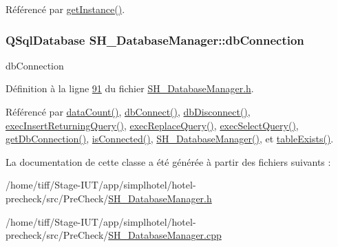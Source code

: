 Référencé par \hyperlink{classSH__DatabaseManager_a31198eb4de0f8b18e3fa0eed09f24d19}{get\-Instance()}.

\hypertarget{classSH__DatabaseManager_a9291f61c3abbba2c4f1567b1d8325f0e}{
\subsubsection[{db\-Connection}]{\setlength{\rightskip}{0pt plus 5cm}Q\-Sql\-Database S\-H\-\_\-\-Database\-Manager\-::db\-Connection\hspace{0.3cm}{\ttfamily [protected]}}}\label{classSH__DatabaseManager_a9291f61c3abbba2c4f1567b1d8325f0e}


db\-Connection 



Définition à la ligne \hyperlink{SH__DatabaseManager_8h_source_l00091}{91} du fichier \hyperlink{SH__DatabaseManager_8h_source}{S\-H\-\_\-\-Database\-Manager.\-h}.



Référencé par \hyperlink{classSH__DatabaseManager_ad3e372d89b60b43e3f3bae649be6d7fb}{data\-Count()}, \hyperlink{classSH__DatabaseManager_ab634ce39ef483e7ad2fe08d4b8ba74f7}{db\-Connect()}, \hyperlink{classSH__DatabaseManager_a096c26457bbb03f92283c5d104401e90}{db\-Disconnect()}, \hyperlink{classSH__DatabaseManager_a55268fae16792142072af49238f7bb94}{exec\-Insert\-Returning\-Query()}, \hyperlink{classSH__DatabaseManager_a25e0f24d7833c2728f55b85be529063d}{exec\-Replace\-Query()}, \hyperlink{classSH__DatabaseManager_ab8f9850cb68444ab9a4e613b36a3b044}{exec\-Select\-Query()}, \hyperlink{classSH__DatabaseManager_a0ce86f671946975c2e7b4ad50c9a92a2}{get\-Db\-Connection()}, \hyperlink{classSH__DatabaseManager_aba5832c8be2fe4894781c9bf34be5b8b}{is\-Connected()}, \hyperlink{classSH__DatabaseManager_a7b5d0e372c153eb59cdab98588994904}{S\-H\-\_\-\-Database\-Manager()}, et \hyperlink{classSH__DatabaseManager_ac18f4ee3abd86cb0db25b3cb593e28b8}{table\-Exists()}.



La documentation de cette classe a été générée à partir des fichiers suivants \-:\begin{DoxyCompactItemize}
\item 
/home/tiff/\-Stage-\/\-I\-U\-T/app/simplhotel/hotel-\/precheck/src/\-Pre\-Check/\hyperlink{SH__DatabaseManager_8h}{S\-H\-\_\-\-Database\-Manager.\-h}\item 
/home/tiff/\-Stage-\/\-I\-U\-T/app/simplhotel/hotel-\/precheck/src/\-Pre\-Check/\hyperlink{SH__DatabaseManager_8cpp}{S\-H\-\_\-\-Database\-Manager.\-cpp}\end{DoxyCompactItemize}
